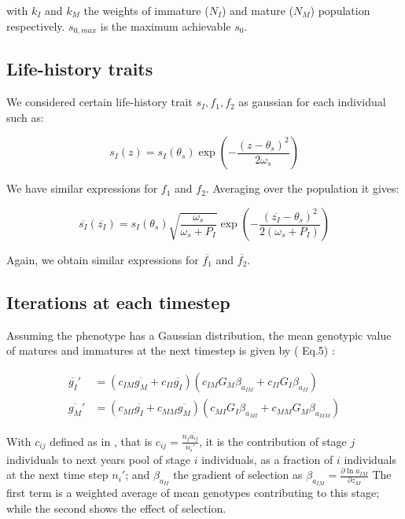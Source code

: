 with $k_{I}$ and $k_{M}$ the weights of immature ($N_{I}$) and mature ($N_{M}$) population respectively. $s_{0, max}$ is the maximum achievable $s_{0}$.

\subsection*{Life-history traits}

We considered certain life-history trait $s_{I}, f_{1}, f_{2}$ as gaussian for each individual such as:

\begin{equation}
	\label{eq:indlht}
	s_{I}(z) = s_{I}(\theta_{s})	\exp\left(-\frac{(z - \theta_{s})^2}{2\omega_{s}}\right)
\end{equation}

We have similar expressions for $f_1$ and $f_2$. Averaging over the population it gives:


\begin{equation}
	\label{eq:poplht}
	\overline{s_{I}}(\overline{z_{I}}) = s_{I}(\theta_{s}) \sqrt{\frac{\omega_{s}}{\omega_{s}+P_{I}}}	\exp\left(-\frac{(\overline{z_{I}} - \theta_{s})^2}{2(\omega_{s}+P_{I})}\right)
\end{equation}

Again, we obtain similar expressions for $\overline{f_1}$ and $\overline{f_2}$.	

\subsection*{Iterations at each timestep}

Assuming the phenotype has a Gaussian distribution,  the mean genotypic value of matures and immatures at the next timestep is given by (\citealt{barfield_evolution_2011} Eq.5) :

\begin{subequations}
	\begin{align}
		\label{eq:genotypic}
		\overline{g_{I}}' &= (c_{I M} \overline{g_{M}} + c_{I I} \overline{g_{I}}) 
			(c_{I M} G_M \beta_{a_{IM}} + c_{I I} G_I \beta_{a_{II}}) \\
		\overline{g_{M}}' &=	 (c_{M I} \overline{g_{I}} + c_{M M} \overline{g_{M}}) 
				(c_{M I} G_I \beta_{a_{MI}} + c_{M M} G_M \beta_{a_{MM}})
	\end{align}
\end{subequations}

With $c_{ij}$ defined as in \citep{barfield_evolution_2011}, that is $c_{ij} = \frac{n_j \overline{a_{ij}}}{n_i'}$, it is the contribution of stage $j$ individuals to next years pool of stage $i$ individuals, as a fraction of $i$ individuals at the next time step $n_i'$; and $\beta_{a_{II}}$ the gradient of selection as $\beta_{a_{IM}} = \frac{\partial \ln \overline{a_{IM}}}{\partial \overline{z_{M}}}$ 
The first term is a weighted average of mean genotypes contributing to this stage; while the second shows the effect of selection.


